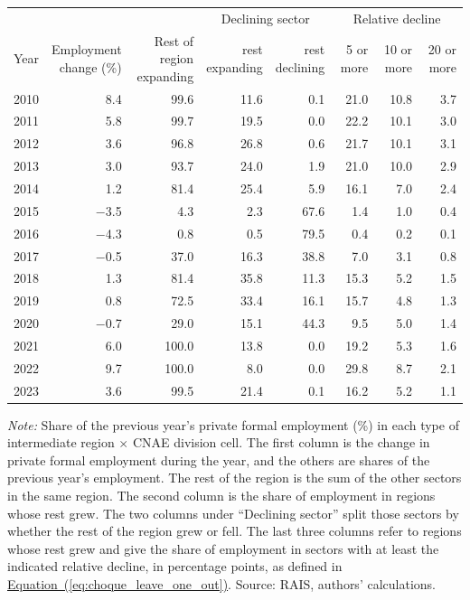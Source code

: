 {\footnotesize
\begin{threeparttable}
\begin{tabular}{lrrrrrrr}
\toprule
 & & & \multicolumn{2}{c}{Declining sector} & \multicolumn{3}{c}{Relative decline} \\
\cmidrule(lr){4-5}\cmidrule(lr){6-8}
Year & \shortstack{Employment\\change (\%)} & \shortstack{Rest of region\\expanding} & \shortstack{rest\\expanding} & \shortstack{rest\\declining} & 5 or more & 10 or more & 20 or more \\
\midrule
2010 & 8.4 & 99.6 & 11.6 & 0.1 & 21.0 & 10.8 & 3.7 \\
2011 & 5.8 & 99.7 & 19.5 & 0.0 & 22.2 & 10.1 & 3.0 \\
2012 & 3.6 & 96.8 & 26.8 & 0.6 & 21.7 & 10.1 & 3.1 \\
2013 & 3.0 & 93.7 & 24.0 & 1.9 & 21.0 & 10.0 & 2.9 \\
2014 & 1.2 & 81.4 & 25.4 & 5.9 & 16.1 & 7.0 & 2.4 \\
2015 & $-$3.5 & 4.3 & 2.3 & 67.6 & 1.4 & 1.0 & 0.4 \\
2016 & $-$4.3 & 0.8 & 0.5 & 79.5 & 0.4 & 0.2 & 0.1 \\
2017 & $-$0.5 & 37.0 & 16.3 & 38.8 & 7.0 & 3.1 & 0.8 \\
2018 & 1.3 & 81.4 & 35.8 & 11.3 & 15.3 & 5.2 & 1.5 \\
2019 & 0.8 & 72.5 & 33.4 & 16.1 & 15.7 & 4.8 & 1.3 \\
2020 & $-$0.7 & 29.0 & 15.1 & 44.3 & 9.5 & 5.0 & 1.4 \\
2021 & 6.0 & 100.0 & 13.8 & 0.0 & 19.2 & 5.3 & 1.6 \\
2022 & 9.7 & 100.0 & 8.0 & 0.0 & 29.8 & 8.7 & 2.1 \\
2023 & 3.6 & 99.5 & 21.4 & 0.1 & 16.2 & 5.2 & 1.1 \\
\bottomrule
\end{tabular}
\begin{tablenotes}[flushleft]\footnotesize
\item \textit{Note:} Share of the previous year's private formal employment (\%) in each type of intermediate region $\times$ CNAE division cell. The first column is the change in private formal employment during the year, and the others are shares of the previous year's employment. The rest of the region is the sum of the other sectors in the same region. The second column is the share of employment in regions whose rest grew. The two columns under ``Declining sector'' split those sectors by whether the rest of the region grew or fell. The last three columns refer to regions whose rest grew and give the share of employment in sectors with at least the indicated relative decline, in percentage points, as defined in \hyperref[eq:choque_leave_one_out]{Equation~(\ref*{eq:choque_leave_one_out})}. Source: RAIS, authors' calculations.
\end{tablenotes}
\end{threeparttable}
}
